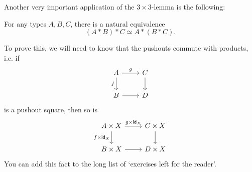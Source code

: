 \documentclass[10pt,oneside,leqno,openright]{memoir}
\begin{document}
Another very important application of the $3 \times 3$-lemma is the following: 
\begin{proposition}
  For any types $A,B,C$, there is a natural equivalence
  \[(A * B) * C \simeq A * (B * C).\]
\end{proposition}
To prove this, we will need to know that the pushouts commute with products, i.e. if
\[\begin{tikzcd}[ampersand replacement=\&]
	A \& C \\
	B \& D
	\arrow["g", from=1-1, to=1-2]
	\arrow["f"', from=1-1, to=2-1]
	\arrow[from=1-2, to=2-2]
	\arrow[from=2-1, to=2-2]
\end{tikzcd}\]
is a pushout square, then so is
\[\begin{tikzcd}[ampersand replacement=\&]
	A \times X \& C \times X \\
	B \times X \& D \times X
	\arrow["g \times \mathsf{id}_X", from=1-1, to=1-2]
	\arrow["f \times \mathsf{id}_X"', from=1-1, to=2-1]
	\arrow[from=1-2, to=2-2]
	\arrow[from=2-1, to=2-2]
\end{tikzcd}\]
You can add this fact to the long list of `exercises left for the reader'.
\end{document}
